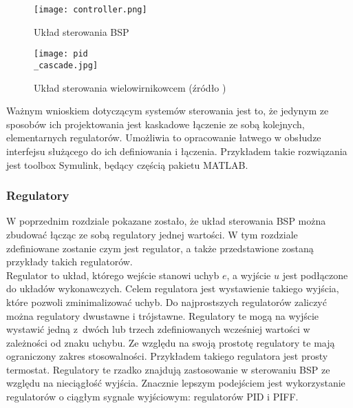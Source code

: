 \begin{figure}[!h]
   	\centering
      	\texttt{[image: controller.png]}
      	\caption{Układ sterowania BSP}
      	\label{control_3_stage}
\end{figure}

\begin{figure}[!h]
   	\centering
      	\texttt{[image: pid\\\_cascade.jpg]}
      	\caption{Układ sterowania wielowirnikowcem (źródło \cite{energies})}
      	\label{pid_ladder}
\end{figure}

Ważnym wnioskiem dotyczącym systemów sterowania jest to, że jedynym ze sposobów ich projektowania jest kaskadowe łączenie ze sobą kolejnych, elementarnych regulatorów. Umożliwia to opracowanie łatwego w obsłudze interfejsu służącego do ich definiowania i łączenia. Przykładem takie rozwiązania jest toolbox Symulink, będący częścią pakietu MATLAB.

\subsubsection{Regulatory}

W poprzednim rozdziale pokazane zostało, że układ sterowania BSP można zbudować łącząc ze sobą regulatory jednej wartości. W tym rozdziale zdefiniowane zostanie czym jest regulator, a także przedstawione zostaną przykłady takich regulatorów.\\

Regulator to układ, którego wejście stanowi uchyb $e$, a wyjście $u$ jest podłączone do układów wykonawczych. Celem regulatora jest wystawienie takiego wyjścia, które pozwoli zminimalizować uchyb. Do najprostszych regulatorów zaliczyć można regulatory dwustawne i trójstawne. Regulatory te mogą na wyjście wystawić jedną z~dwóch lub trzech zdefiniowanych wcześniej wartości w zależności od znaku uchybu. Ze względu na swoją prostotę regulatory te mają ograniczony zakres stosowalności. Przykładem takiego regulatora jest prosty termostat. Regulatory te rzadko znajdują zastosowanie w sterowaniu BSP ze względu na nieciągłość wyjścia. Znacznie lepszym podejściem jest wykorzystanie regulatorów o ciągłym sygnale wyjściowym: regulatorów PID i PIFF.\\

